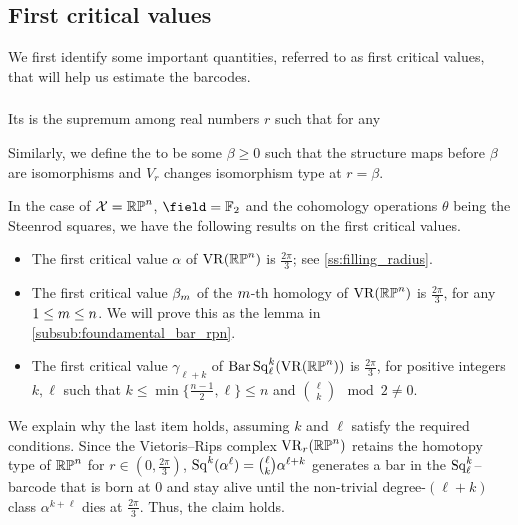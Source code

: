 \subsection{First critical values}

We first identify some important quantities, referred to as first critical values, that will help us estimate the barcodes.

\subsubsection{}
\label{subsub:first_critical_value}

Its  is the supremum among real numbers $r$ such that for any

Similarly, we define the  to be some $\beta \geq 0$ such that the structure maps before $\beta$ are isomorphisms and $V_r$ changes isomorphism type at $r = \beta$.

\medskip\example
In the case of $\mathcal{X} = \mathbb{RP}^n$, $\field = \Ftwo$ and the cohomology operations $\theta$ being the Steenrod squares, we have the following results on the first critical values.
\begin{itemize}
    \item  The first critical value $\alpha$ of $\operatorname{VR}(\mathbb{RP}^n)$ is $\tfrac{2\pi}{3}$; see \cref{ss:filling_radius}.
    \item The first critical value $\beta_m$ of the $m$-th homology of $\operatorname{VR}(\mathbb{RP}^n)$ is $\tfrac{2\pi}{3}$, for any $1 \leq m \leq n$. We will prove this as the lemma in \cref{subsub:foundamental_bar_rpn}.
    \item The first critical value $\gamma_{\ell+k}$ of $\operatorname{Bar}\operatorname{Sq}^{k}_{\ell}(\operatorname{VR}(\mathbb{RP}^n))$ is $\tfrac{2\pi}{3}$, for positive integers $k, \ell$ such that $k \leq \min\{\frac{n-1}{2}, \ell\} \leq n$ and $\binom{\ell}{k} \mod 2\neq 0$. 
\end{itemize}
We explain why the last item holds, assuming $k$ and $\ell$ satisfy the required conditions.
Since the Vietoris--Rips complex $\operatorname{VR}_r(\mathbb{RP}^n)$ retains the homotopy type of $\mathbb{RP}^n$ for $r \in (0,\tfrac{2\pi}{3})$, $\operatorname{Sq}^k(\alpha^\ell) = \binom{\ell}{k}\alpha^{\ell+k}$ generates a bar in the $\operatorname{Sq}^k_\ell$--barcode that is born at $0$ and stay alive until the non-trivial degree-$(\ell+k)$ class $\alpha^{k+\ell}$ dies at $\tfrac{2\pi}{3}$.
Thus, the claim holds.

